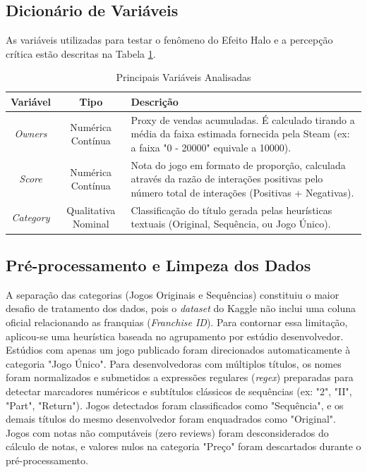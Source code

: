 \documentclass[conference]{IEEEtran}
\begin{document}
\subsection{Dicionário de Variáveis}
As variáveis utilizadas para testar o fenômeno do Efeito Halo e a 
percepção crítica estão descritas na Tabela \ref{tab_variaveis}. 

\begin{table}[htbp]
\caption{Principais Variáveis Analisadas}
\begin{center}
\begin{tabular}{|c|c|p{4cm}|}
\hline
\textbf{Variável} & \textbf{Tipo} & \textbf{Descrição} \\
\hline
\textit{Owners} & Numérica Contínua & Proxy de vendas acumuladas. 
É calculado tirando a média da faixa estimada fornecida pela Steam 
(ex: a faixa "0 - 20000" equivale a 10000). \\
\hline
\textit{Score} & Numérica Contínua & Nota do jogo em formato de proporção, 
calculada através da razão de interações positivas pelo número total de 
interações (Positivas + Negativas). \\
\hline
\textit{Category} & Qualitativa Nominal & Classificação do título gerada 
pelas heurísticas textuais (Original, Sequência, ou Jogo Único). \\
\hline
\end{tabular}
\label{tab_variaveis}
\end{center}
\end{table}

\subsection{Pré-processamento e Limpeza dos Dados}
A separação das categorias (Jogos Originais e Sequências) constituiu o 
maior desafio de tratamento dos dados, pois o \textit{dataset} do 
Kaggle não inclui uma coluna oficial relacionando as franquias 
(\textit{Franchise ID}). Para contornar essa limitação, 
aplicou-se uma heurística baseada no agrupamento por estúdio desenvolvedor. 
Estúdios com apenas um jogo publicado foram direcionados 
automaticamente à categoria "Jogo Único". 
Para desenvolvedoras com múltiplos títulos, os nomes foram normalizados 
e submetidos a expressões regulares (\textit{regex}) 
preparadas para detectar marcadores numéricos e subtítulos 
clássicos de sequências (ex: "2", "II", "Part", "Return"). 
Jogos detectados foram classificados como "Sequência", 
e os demais títulos do mesmo desenvolvedor foram enquadrados 
como "Original". Jogos com notas não computáveis (zero reviews) 
foram desconsiderados do cálculo de notas, e valores nulos na 
categoria "Preço" foram descartados durante o pré-processamento.
\end{document}
